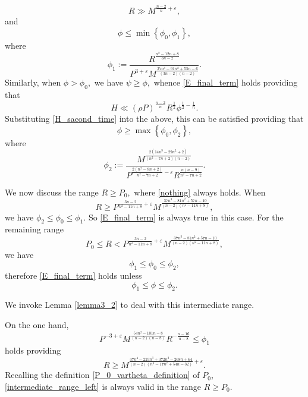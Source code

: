 \documentclass[12pt]{amsart}
\theoremstyle{definition}
\numberwithin{equation}{section}
\begin{document}
\begin{equation}
 \label{nothing}
    R \gg M^{\frac{n-2}{n}+\varepsilon},
\end{equation}
and
\begin{equation*}
    \phi \leq \min\left\{\phi_0, \phi_1\right\},
\end{equation*}
where
\begin{equation}
    \label{phi_1_definition}
    \phi_1 := \frac{R^{\frac{n^2-12n+8}{3n-2}}}{P^{3+\varepsilon}M^{\frac{37n^3-91n^2+55n-6}{(3n-2)(n-2)}}}.
\end{equation}
Similarly, when $\phi > \phi_0,$ we have $\psi \geq \phi,$ whence \eqref{E_final_term} holds
providing that
\begin{equation*}
    H\ll (\rho P)^{\frac{n-2}{n}}R^{\frac{1}{2}}\phi^{\frac{1}{2}-\frac{1}{n}}.
\end{equation*}
Substituting \eqref{H_sacond_time} into the above, this can be satisfied providing that
\begin{equation*}
    \phi \geq \max\left\{\phi_0, \phi_2\right\},
\end{equation*}
where 
\begin{equation}
    \label{phi_2_definition}
    \phi_2 := \frac{M^{\frac{2(14n^3-29n^2+2)}{(n^2-7n+2)(n-2)}}}{P^{\frac{2(n^2-8n+2)}{n^2-7n+2}-\varepsilon}R^{\frac{n(n-9)}{n^2-7n+2}}}.
\end{equation}


We now discuss the range $R \geq P_0,$ where \eqref{nothing} always holds.
When 
$$
R \geq P^{\frac{3n-2}{n^2-11n+8}+\varepsilon}M^{\frac{37n^3-81n^2+57n-10}{(n-2)(n^2-11n+8)}},
$$
we have $\phi_2 \leq \phi_0 \leq \phi_1.$ So \eqref{E_final_term} is always true in this case. 
For the remaining range
$$
P_0 \leq R < P^{\frac{3n-2}{n^2-11n+8}+\varepsilon}M^{\frac{37n^3-81n^2+57n-10}{(n-2)(n^2-11n+8)}},
$$
we have 
$$
\phi_1 \leq \phi_0 \leq \phi_2,
$$
therefore \eqref{E_final_term} holds unless 
$$
\phi_1 \leq \phi \leq \phi_2.
$$

We invoke Lemma \ref{lemma3_2} to deal with this intermediate range.

On the one hand,
\begin{equation*}
    P^{-3+\varepsilon}M^{\frac{54n^2-101n-8}{(n-2)(n-8)}}R^{-\frac{n-16}{n-8}} \leq \phi_1
\end{equation*}
holds providing 
\begin{equation}
    \label{intermediate_range_left}
    R \geq M^{\frac{37n^4-225n^3+ 372n^2-268n+64}{(n-2)(n^3-17n^2+54n-32)}+\varepsilon}.
\end{equation}
Recalling the definition \eqref{P_0_vartheta_definition} of $P_0$, \eqref{intermediate_range_left} is always valid in the range $R \geq P_0.$
\end{document}
